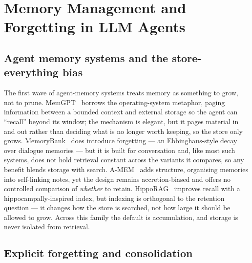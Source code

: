 

\section{Memory Management and Forgetting in LLM Agents}

\subsection{Agent memory systems and the store-everything bias}

The first wave of agent-memory systems treats memory as something to grow, not to prune.
MemGPT~\cite{packer2024} borrows the operating-system metaphor, paging information between
a bounded context and external storage so the agent can ``recall'' beyond its window; the
mechanism is elegant, but it pages material in and out rather than deciding what is no
longer worth keeping, so the store only grows. MemoryBank~\cite{zhong2024} does introduce
forgetting --- an Ebbinghaus-style decay over dialogue memories --- but it is built for
conversation and, like most such systems, does not hold retrieval constant across the
variants it compares, so any benefit blends storage with search. A-MEM~\cite{xu2025} adds
structure, organising memories into self-linking notes, yet the design remains
accretion-biased and offers no controlled comparison of \emph{whether} to retain.
HippoRAG~\cite{gutierrez2024hipporag} improves recall with a hippocampally-inspired index,
but indexing is orthogonal to the retention question --- it changes how the store is
searched, not how large it should be allowed to grow. Across this family the default is
accumulation, and storage is never isolated from retrieval.

\subsection{Explicit forgetting and consolidation}

